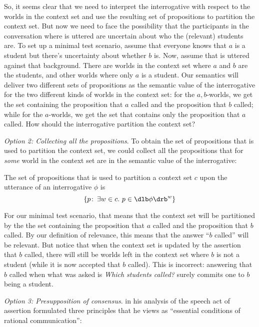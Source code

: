So, it seems clear that we need to interpret the interrogative with respect to
the worlds in the context set and use the resulting set of propositions to
partition the context set. But now we need to face the possibility that the
participants in the conversation where \Last is uttered are uncertain about who
the (relevant) students are. To set up a minimal test scenario, assume that
everyone knows that $a$ is a student but there's uncertainty about whether $b$
is. Now, assume that \Last is uttered against that background. There are worlds
in the context set where $a$ and $b$ are the students, and other worlds where
only $a$ is a student. Our semantics will deliver two different sets of
propositions as the semantic value of the interrogative for the two different
kinds of worlds in the context set: for the $a,b$-worlds, we get the set
containing the proposition that $a$ called and the proposition that $b$ called;
while for the $a$-worlds, we get the set that contains only the proposition that
$a$ called. How should the interrogative partition the context set?

\clearpage
\emph{Option 2: Collecting all the propositions}. To obtain the set of
propositions that is used to partition the context set, we could collect all the
propositions that for \emph{some} world in the context set are in the semantic
value of the interrogative:

\ex The set of propositions that is used to partition a context set $c$ upon
the utterance of an interrogative $\phi$ is
\[\{p\co \exists w\in c.\ p\in\sv{\phi}^w\}\]
\xe

For our minimal test scenario, that means that the context set will be
partitioned by the the set containing the proposition that $a$ called and the
proposition that $b$ called. By our definition of relevance, this means that the
answer ``$b$ called'' will be relevant. But notice that when the context set is
updated by the assertion that $b$ called, there will still be worlds left in the
context set where $b$ is not a student (while it is now accepted that $b$ called).
This is incorrect: answering that $b$ called when what was asked is \emph{Which
  students called?} surely commits one to $b$ being a student.

\emph{Option 3: Presupposition of consensus}. \cite{stalnaker-1978-assertion} in
his analysis of the speech act of assertion formulated three principles that he
views as ``essential conditions of rational communication'':

